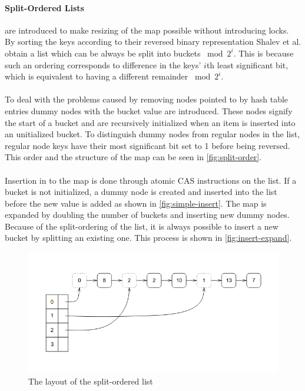 \documentclass{uit-thesis}
\begin{document}
\paragraph{Split-Ordered Lists}
are introduced to make resizing of the map possible without introducing locks. By sorting the keys according to their reversed binary representation Shalev et al. obtain a list which can be always be split into buckets $\bmod{2^i}$. This is because such an ordering corresponds to difference in the keys' $i$th least significant bit, which is equivalent to having a different remainder $\bmod{2^i}$.
\\\\
To deal with the problems caused by removing nodes pointed to by hash table entries dummy nodes with the bucket value are introduced. These nodes signify the start of a bucket and are recursively initialized when an item is inserted into an unitialized bucket. To distinguish dummy nodes from regular nodes in the list, regular node keys have their most significant bit set to 1 before being reversed. This order and the structure of the map can be seen in \autoref{fig:split-order}.
\\\\
Insertion in to the map is done through atomic CAS instructions on the list. If a bucket is not initialized, a dummy node is created and inserted into the list before the new value is added as shown in \autoref{fig:simple-insert}. The map is expanded by doubling the number of buckets and inserting new dummy nodes. Because of the split-ordering of the list, it is always possible to insert a new bucket by splitting an existing one. This process is shown in \autoref{fig:insert-expand}.
\begin{figure}
    \includegraphics[width=\textwidth]{split-ordered-list-diagram.png}
\caption{The layout of the split-ordered list}
\label{fig:split-order}
\end{figure}
\end{document}
